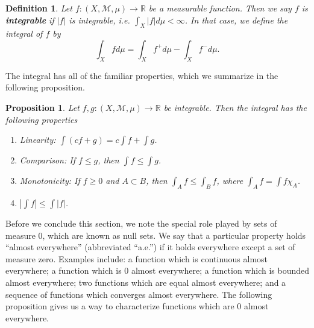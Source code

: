 \documentclass[12pt]{amsart}         %
\newtheorem{definition}{Definition}[section]
\newtheorem{proposition}{Proposition}[section]
\theoremstyle{remark}
\newcommand{\R}{\mathbb{R}}
\begin{document}
\begin{definition}
Let $f:(X, \mathcal{M}, \mu) \rightarrow \R$ be a measurable function. Then we say $f$ is \textbf{integrable} if $|f|$ is integrable, i.e. $\int_X |f| d\mu < \infty$. In that case, we define the integral of $f$ by
\[
\int_X f d\mu=\int_Xf^{+}d\mu-\int_Xf^-d\mu.
\]
\end{definition}

The integral has all of the familiar properties, which we summarize in the following proposition.

\begin{proposition}
Let $f, g:(X, \mathcal{M}, \mu) \rightarrow \R$ be integrable. Then the integral has the following properties
\begin{enumerate}
\item Linearity: $\int(c f + g) = c \int f + \int g$.
\item Comparison: If $f\leq g$, then $\int f \leq \int g$.
\item Monotonicity: If $f\geq 0$ and $A\subset B$, then $\int_A f \leq\int_B f$, where $\int_A f = \int f \chi_A$.
\item $|\int f| \leq \int |f| $.
\end{enumerate}
\end{proposition}

Before we conclude this section, we note the special role played by sets of measure 0, which are known as null sets. We say that a particular property holds ``almost everywhere'' (abbreviated ``a.e.'') if it holds everywhere except a set of measure zero. Examples include: a function which is continuous almost everywhere; a function which is 0 almost everywhere; a function which is bounded almost everywhere; two functions which are equal almost everywhere; and a sequence of functions which converges almost everywhere. The following proposition gives us a way to characterize functions which are 0 almost everywhere.
\end{document}
